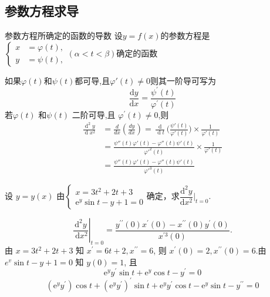 \documentclass[8pt a4paper, oneside, UTF8]{ctexbook}  %
\begin{document}
\begin{sloppypar}
    \subsection{参数方程求导}
    \begin{defn}{参数方程所确定的函数的导数}{}
        设$y=f(x)$的参数方程是$\left\{\begin{aligned}x&=\varphi(t),\\y&=\psi (t),\end{aligned}\right.(\alpha<t<\beta)$确定的函数

        如果$\varphi(t)$和$\psi(t)$都可导,且$\varphi'(t) \neq 0$则其一阶导可写为
        $$
            \dfrac{\mathrm{d}y}{\mathrm{d}x}=\frac{\psi^{\prime}(t)}{\varphi^{\prime}(t)}
        $$
        若$\varphi(t)$ 和$\psi(t)$ 二阶可导,且 $\varphi^{\prime}(t)\neq 0$,则
        $$
            \begin{aligned}
                \frac{\operatorname{d}^2y}{\operatorname{d}x^2} & =\frac{d}{dx}(\frac{dy}{dx}) =\frac{\operatorname{d}}{\operatorname{d}t}\Big(\frac{\psi'(t)}{\varphi'(t)}\Big) \times \frac{1}{\varphi'(t)} \\
                & =\frac{\psi''(t)\varphi'(t)-\varphi''(t)\psi'(t)}{\varphi'^2(t)}\times \frac{1}{\varphi'(t)}                                                \\
                & =\frac{\psi''(t)\varphi'(t)-\varphi''(t)\psi'(t)}{\varphi'^3(t)}
            \end{aligned}
        $$
    \end{defn}
    \begin{problem}
        设 $y=y(x)$ 由$\begin{cases}x=3t^2+2t+3\\\mathrm{e}^y\sin t-y+1=0\end{cases}$确定，求$\dfrac{\mathrm{d}^2y}{\mathrm{d}x^2}\Bigg\vert_{t=0}.$
    \end{problem}
    \begin{solution}
        $$\left.\frac{\mathrm{d}^2 y}{\mathrm{~d} x^2}\right|_{t=0}=\frac{y^{\prime \prime}(0) x^{\prime}(0)-x^{\prime \prime}(0) y^{\prime}(0)}{x^{\prime 3}(0)}.$$
        由 $x=3 t^2+2 t+3$ 知 $x^{\prime}=6 t+2, x^{\prime \prime}=6$, 则 $x^{\prime}(0)=2, x^{\prime \prime}(0)=6$.由 $e^v \sin t-y+1=0$ 知 $y(0)=1$, 且
        $$
            \mathrm{e}^y y^{\prime} \sin t+\mathrm{e}^y \cos t-y^{\prime}=0
        $$
        $$
         \left(\mathrm{e}^y y^{\prime}\right) \cos t+\left(\mathrm{e}^y y^{\prime}\right)^{\prime} \sin t+\mathrm{e}^y y^{\prime} \cos t-\mathrm{e}^y \sin t-y^{\prime \prime}=0
$$
\end{solution}
\end{sloppypar}
\end{document}
